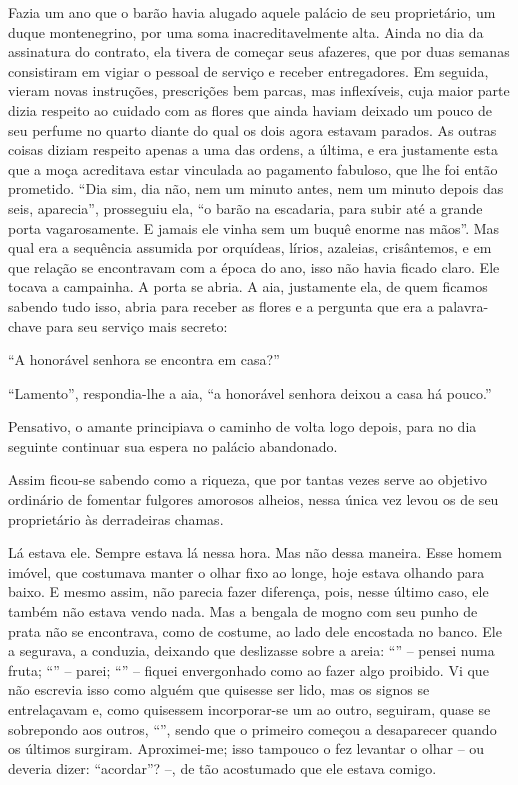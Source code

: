 Fazia um ano que o barão havia alugado aquele palácio de seu
proprietário, um duque montenegrino, por uma soma inacreditavelmente
alta. Ainda no dia da assinatura do contrato, ela tivera de começar seus
afazeres, que por duas semanas consistiram em vigiar o pessoal de
serviço e receber entregadores. Em seguida, vieram novas instruções,
prescrições bem parcas, mas inflexíveis, cuja maior parte dizia respeito
ao cuidado com as flores que ainda haviam deixado um pouco de seu
perfume no quarto diante do qual os dois agora estavam parados. As
outras coisas diziam respeito apenas a uma das ordens, a última, e era
justamente esta que a moça acreditava estar vinculada ao pagamento
fabuloso, que lhe foi então prometido. ``Dia sim, dia não, nem um minuto
antes, nem um minuto depois das seis, aparecia'', prosseguiu ela, ``o
barão na escadaria, para subir até a grande porta vagarosamente. E
jamais ele vinha sem um buquê enorme nas mãos''. Mas qual era a
sequência assumida por orquídeas, lírios, azaleias, crisântemos, e em
que relação se encontravam com a época do ano, isso não havia ficado
claro. Ele tocava a campainha. A porta se abria. A aia, justamente ela,
de quem ficamos sabendo tudo isso, abria para receber as flores e a
pergunta que era a palavra-chave para seu serviço mais secreto:

``A honorável senhora se encontra em casa?''

``Lamento'', respondia-lhe a aia, ``a honorável senhora deixou a casa há
pouco.''

Pensativo, o amante principiava o caminho de volta logo depois, para no
dia seguinte continuar sua espera no palácio abandonado.

Assim ficou-se sabendo como a riqueza, que por tantas vezes serve ao
objetivo ordinário de fomentar fulgores amorosos alheios, nessa única
vez levou os de seu proprietário às derradeiras chamas.


Lá estava ele. Sempre estava lá nessa hora. Mas não dessa maneira. Esse
homem imóvel, que costumava manter o olhar fixo ao longe, hoje estava
olhando para baixo. E mesmo assim, não parecia fazer diferença, pois,
nesse último caso, ele também não estava vendo nada. Mas a bengala de
mogno com seu punho de prata não se encontrava, como de costume, ao lado
dele encostada no banco. Ele a segurava, a conduzia, deixando que
deslizasse sobre a areia: ``'' -- pensei numa fruta; ``'' -- parei;
``'' -- fiquei envergonhado como ao fazer algo proibido. Vi que não
escrevia isso como alguém que quisesse ser lido, mas os signos se
entrelaçavam e, como quisessem incorporar-se um ao outro, seguiram,
quase se sobrepondo aos outros, ``'', sendo que o primeiro começou a
desaparecer quando os últimos surgiram. Aproximei-me; isso tampouco o
fez levantar o olhar -- ou deveria dizer: ``acordar''? --, de tão
acostumado que ele estava comigo.

